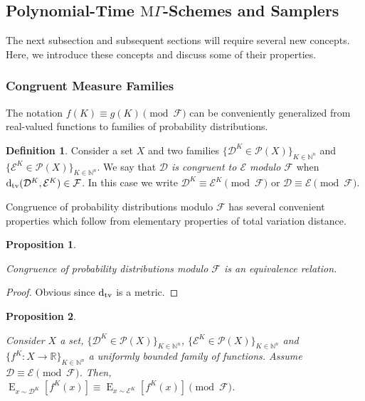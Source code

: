 \documentclass{article}
\numberwithin{equation}{section}
\theoremstyle{definition}
\newtheorem{definition}{Definition}[section]
\theoremstyle{plain}
\newtheorem{proposition}{Proposition}[section]
\DeclareMathOperator{\E}{E}
\newcommand{\Dtv}{\operatorname{d}_{\textnormal{tv}}}
\newcommand{\Nats}{\mathbb{N}}
\newcommand{\Reals}{\mathbb{R}}
\newcommand{\Dist}{\mathcal{D}}
\newcommand{\MGrow}{\mathrm{M}\Gamma}
\newcommand{\Fall}{\mathcal{F}}
\begin{document}
\subsection{Polynomial-Time \texorpdfstring{$\MGrow$}{MΓ}-Schemes and Samplers}

The next subsection and subsequent sections will require several new concepts. Here, we introduce these concepts and discuss some of their properties.

\subsubsection{Congruent Measure Families}

The notation $f(K) \equiv g(K) \pmod \Fall$ can be conveniently generalized from real-valued functions to families of probability distributions.

\begin{samepage}
\begin{definition}

Consider a set $X$ and two families $\{\Dist^K \in \mathcal{P}(X)\}_{K \in \Nats^n}$ and $\{\mathcal{E}^K \in \mathcal{P}(X)\}_{K \in \Nats^n}$. We say that \emph{$\Dist$ is congruent to $\mathcal{E}$ modulo $\Fall$} when $\Dtv(\Dist^K,\mathcal{E}^K) \in \Fall$. In this case we write $\Dist^K \equiv \mathcal{E}^K \pmod \Fall$ or $\Dist \equiv \mathcal{E} \pmod \Fall$.

\end{definition}
\end{samepage}

Congruence of probability distributions modulo $\Fall$ has several convenient properties which follow from elementary properties of total variation distance.

\begin{samepage}
\begin{proposition}
\label{prp:prob_cong_eq}

Congruence of probability distributions modulo $\Fall$ is an equivalence relation.

\end{proposition}
\end{samepage}

\begin{proof}

Obvious since $\Dtv$ is a metric.
\end{proof}

\begin{samepage}
\begin{proposition}
\label{prp:prob_cong_ev}

Consider $X$ a set, $\{\Dist^K \in \mathcal{P}(X)\}_{K \in \Nats^n}$, $\{\mathcal{E}^K \in \mathcal{P}(X)\}_{K \in \Nats^n}$ and ${\{f^K: X \rightarrow \Reals\}_{K \in \Nats^n}}$ a uniformly bounded family of functions. Assume ${\Dist \equiv \mathcal{E} \pmod \Fall}$. Then,\\ ${\E_{x \sim \Dist^K}[f^K(x)] \equiv \E_{x \sim \mathcal{E}^K}[f^K(x)] \pmod \Fall}$.

\end{proposition}
\end{samepage}
\end{document}
